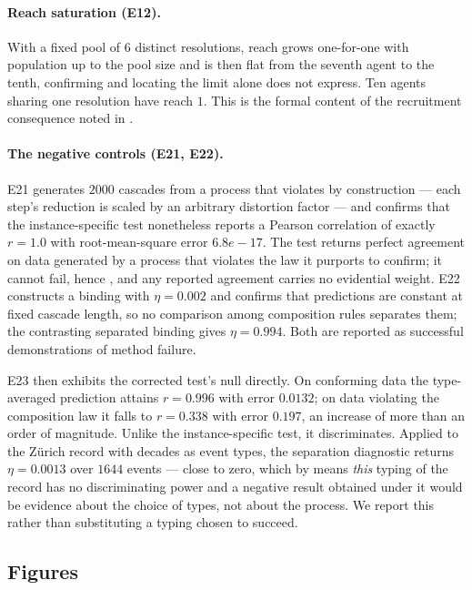\documentclass[11pt,a4paper]{article}
\theoremstyle{clstyle}
\theoremstyle{definition}
\theoremstyle{remark}
\begin{document}
\paragraph{Reach saturation (E12).} With a fixed pool of 6 distinct
resolutions, reach grows one-for-one with population up to the pool size and
is then flat from the seventh agent to the tenth, confirming
 and locating the limit  alone does
not express. Ten agents sharing one resolution have reach $1$. This is the
formal content of the recruitment consequence noted in
.

\paragraph{The negative controls (E21, E22).} E21 generates $2000$ cascades
from a process that violates  by construction ---
each step's reduction is scaled by an arbitrary distortion factor --- and
confirms that the instance-specific test nonetheless reports a Pearson
correlation of exactly $r=1.0$ with root-mean-square error $6.8e-17$. The test
returns perfect agreement on data generated by a process that violates the
law it purports to confirm; it cannot fail, hence , and any
reported agreement carries no evidential weight. E22 constructs a binding
with $\eta=0.002$ and confirms that predictions are constant at fixed cascade
length, so no comparison among composition rules separates them; the
contrasting separated binding gives $\eta=0.994$. Both are reported as
successful demonstrations of method failure.

E23 then exhibits the corrected test's null directly. On conforming data the
type-averaged prediction attains $r=0.996$ with error $0.0132$; on data
violating the composition law it falls to $r=0.338$ with error $0.197$, an
increase of more than an order of magnitude. Unlike the instance-specific
test, it discriminates. Applied to the Z{\"u}rich record with decades as event
types, the separation diagnostic returns $\eta=0.0013$ over $1644$ events ---
close to zero, which by  means \emph{this} typing of
the record has no discriminating power and a negative result obtained under
it would be evidence about the choice of types, not about the process. We
report this rather than substituting a typing chosen to succeed.


\subsection{Figures}
\label{sec:figures}
\end{document}

